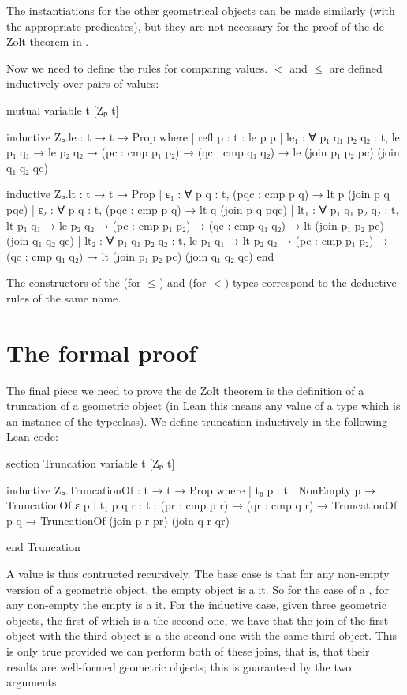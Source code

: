 \documentclass[12pt]{article} %
\begin{document}
{The instantiations for the other geometrical objects can be made similarly (with the appropriate predicates), but they are not necessary for the proof of the de Zolt theorem in \zp. %

Now we need to define the rules for comparing \zp{} values. %
\(<\) and \(\leq\) are defined inductively over pairs of \zp{} values: %
\begin{leancode}
mutual
  variable {t} [Zₚ t]

  inductive Zₚ.le : t → t → Prop where
  | refl {p : t} : le p p
  | le₁ : ∀ {p₁ q₁ p₂ q₂ : t}, le p₁ q₁ → le p₂ q₂
        → (pc : cmp p₁ p₂) → (qc : cmp q₁ q₂)
        → le (join p₁ p₂ pc) (join q₁ q₂ qc)

  inductive Zₚ.lt : t → t → Prop
  | ε₁ : ∀ {p q : t}, (pqc : cmp p q) → lt p (join p q pqc)
  | ε₂ : ∀ {p q : t}, (pqc : cmp p q) → lt q (join p q pqc)
  | lt₁ : ∀ {p₁ q₁ p₂ q₂ : t}, lt p₁ q₁ → le p₂ q₂
        → (pc : cmp p₁ p₂) → (qc : cmp q₁ q₂)
        → lt (join p₁ p₂ pc) (join q₁ q₂ qc)
  | lt₂ : ∀ {p₁ q₁ p₂ q₂ : t}, le p₁ q₁ → lt p₂ q₂
        → (pc : cmp p₁ p₂) → (qc : cmp q₁ q₂)
        → lt (join p₁ p₂ pc) (join q₁ q₂ qc)
end
\end{leancode}
The constructors of the  (for \(\leq\)) and  (for \(<\)) types correspond to the \zp{} deductive rules of the same name. %

\section{The formal proof}\label{sec:de-zolt-theorem} %

The final piece we need to prove the de Zolt theorem is the definition of a truncation of a geometric object (in Lean this means any value of a type which is an instance of the \zp{} typeclass). %
We define truncation inductively in the following Lean code: %
\begin{leancode}
section Truncation
variable {t} [Zₚ t]

inductive Zₚ.TruncationOf : t → t → Prop where
| t₀ {p : t} : NonEmpty p → TruncationOf ε p
| t₁ {p q r : t} : (pr : cmp p r) → (qr : cmp q r)
    → TruncationOf p q
    → TruncationOf (join p r pr) (join q r qr)

end Truncation
\end{leancode}

A \truncof{} value is thus contructed recursively. %
The base case is that for any non-empty version of a geometric object, the empty object is a \truncof{} it. %
So for the case of a \pvolume, for any non-empty \pvolume{} the empty \pvolume{} is a \truncof{} it. %
For the inductive case, given three geometric objects, the first of which is a \truncof{} the second one, we have that the join of the first object with the third object is a \truncof{} the second one with the same third object. %
This is only true provided we can perform both of these joins, that is, that their results are well-formed geometric objects; this is guaranteed by the two  arguments. %

}
\end{document}
